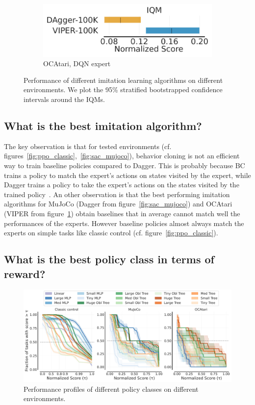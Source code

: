 \begin{figure}[ht]
\begin{subfigure}{.33\textwidth}
  \centering
  \includegraphics[width=\linewidth]{images/images_part3/dqn_expert_atari.pdf}
  \caption{OCAtari, DQN expert}
  \label{fig:dqn_atari}
\end{subfigure}%
\caption{Performance of different imitation learning algorithms on different environments. We plot the 95\% stratified bootstrapped confidence intervals around the IQMs.}
\label{fig:performance_comparison}
\end{figure}

\subsection{What is the best imitation algorithm?}

The key observation is that for tested environments (cf. figures~\ref{fig:ppo_classic},~\ref{fig:sac_mujoco}), behavior cloning is not an efficient way to train baseline policies compared to Dagger.
This is probably because BC trains a policy to match the expert's actions on states visited by the expert, while Dagger trains a policy to take the expert's actions on the states visited by the trained policy~\cite{dagger}.
An other observation is that the best performing imitation algorithms for MuJoCo (Dagger from figure~\ref{fig:sac_mujoco}) and OCAtari (VIPER from figure~\ref{fig:dqn_atari}) obtain baselines that in average cannot match well the performances of the experts.
However baseline policies almost always match the experts on simple tasks like classic control (cf. figure~\ref{fig:ppo_classic}).

\subsection{What is the best policy class in terms of reward?}

\begin{figure}[ht]
    \centering
    \includegraphics[trim={0 0 0 0.2cm},clip,width=0.9\linewidth]{images/images_part3/perf_profile_combined_100k.pdf}
    \caption{Performance profiles of different policy classes on different environments.}
    \label{fig:perf-combined}
\end{figure}

